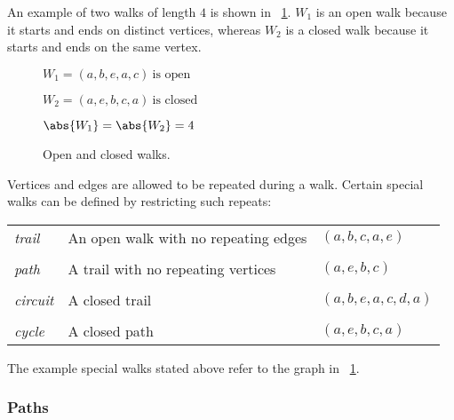 An example of two walks of length \(4\) is shown in \figurename~\ref{fig:walks}.  \(W_1\) is an open walk because
it starts and ends on distinct vertices, whereas \(W_2\) is a closed walk because it starts and ends on the same
vertex.

\begin{figure}[H]
  \begin{minipage}{2.75in}
    \centering
  \end{minipage}
  \begin{minipage}{2.75in}
    \(W_1=(a,b,e,a,c)\ \text{is open}\)

    \(W_2=(a,e,b,c,a)\ \text{is closed}\)

    \bigskip

    \(\abs{W_1}=\abs{W_2}=4\)
  \end{minipage}
  \caption{Open and closed walks.}
  \label{fig:walks}
\end{figure}

Vertices and edges are allowed to be repeated during a walk.  Certain special walks can be defined by restricting
such repeats:

\begin{center}
  \begin{tabular}{lll}
    \emph{trail} & An open walk with no repeating edges & \((a,b,c,a,e)\) \\
    \\
    \emph{path} & A trail with no repeating vertices & \((a,e,b,c)\) \\
    \\
    \emph{circuit} & A closed trail & \((a,b,e,a,c,d,a)\) \\
    \\
    \emph{cycle} & A closed path & \((a,e,b,c,a)\)
  \end{tabular}
\end{center}

The example special walks stated above refer to the graph in \figurename~\ref{fig:walks}.

\subsubsection{Paths}\label{sec:sub:sub:walkpath}

